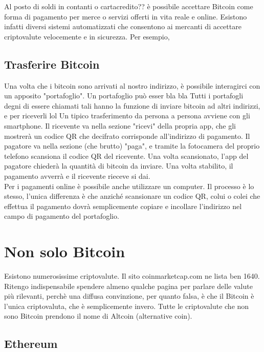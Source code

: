 \documentclass {article}
\begin{document}
Al posto di soldi in contanti o cartacredito?? è possibile accettare Bitcoin come forma di pagamento per merce o servizi offerti in vita reale e online.
Esistono infatti diversi sistemi automatizzati che consentono ai mercanti di accettare criptovalute velocemente e in sicurezza.
Per esempio, 


\subsection {Trasferire Bitcoin}


Una volta che i bitcoin sono arrivati al nostro indirizzo, è possibile interagirci con un apposito "portafoglio". Un portafoglio può esser bla bla
Tutti i portafogli degni di essere chiamati tali hanno la funzione di inviare bitcoin ad altri indirizzi, e per riceverli lol
Un tipico trasferimento da persona a persona avviene con gli smartphone.
Il ricevente va nella sezione "ricevi" della propria app, che gli mostrerà un codice QR che decifrato corrisponde all'indirizzo di pagamento.
Il pagatore va nella sezione (che brutto) "paga", e tramite la fotocamera del proprio telefono scansiona il codice QR del ricevente.
Una volta scansionato, l'app del pagatore chiederà la quantità di bitcoin da inviare. Una volta stabilito, il pagamento avverrà e il ricevente rieceve si dai.
\\
Per i pagamenti online è possibile anche utilizzare un computer. Il processo è lo stesso, l'unica differenza è che anziché scansionare un codice QR, colui o colei che effettua il pagamento dovrà semplicemente copiare e incollare l'indirizzo nel campo di pagamento del portafoglio.


\section {Non solo Bitcoin}


Esistono numerosissime criptovalute. Il sito coinmarketcap.com ne lista ben 1640. Ritengo indispensabile spendere almeno qualche pagina per parlare delle valute più rilevanti, perchè una diffusa convinzione, per quanto falsa, è che il Bitcoin è l'unica criptovaluta, che è semplicemente invero. Tutte le criptovalute che non sono Bitcoin prendono il nome di Altcoin (alternative coin).


\subsection {Ethereum}
\end{document}
